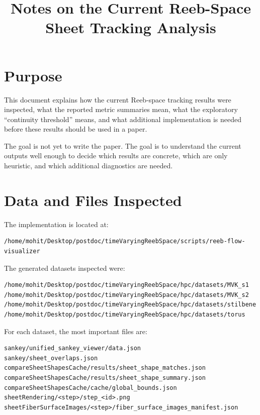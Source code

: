 \documentclass[11pt]{article}
\title{Notes on the Current Reeb-Space Sheet Tracking Analysis}
\author{}
\date{}
\begin{document}
\maketitle

\section{Purpose}

This document explains how the current Reeb-space tracking results were
inspected, what the reported metric summaries mean, what the exploratory
``continuity threshold'' means, and what additional implementation is needed
before these results should be used in a paper.

The goal is not yet to write the paper. The goal is to understand the current
outputs well enough to decide which results are concrete, which are only
heuristic, and which additional diagnostics are needed.

\section{Data and Files Inspected}

The implementation is located at:

\begin{verbatim}
/home/mohit/Desktop/postdoc/timeVaryingReebSpace/scripts/reeb-flow-visualizer
\end{verbatim}

The generated datasets inspected were:

\begin{verbatim}
/home/mohit/Desktop/postdoc/timeVaryingReebSpace/hpc/datasets/MVK_s1
/home/mohit/Desktop/postdoc/timeVaryingReebSpace/hpc/datasets/MVK_s2
/home/mohit/Desktop/postdoc/timeVaryingReebSpace/hpc/datasets/stilbene
/home/mohit/Desktop/postdoc/timeVaryingReebSpace/hpc/datasets/torus
\end{verbatim}

For each dataset, the most important files are:

\begin{verbatim}
sankey/unified_sankey_viewer/data.json
sankey/sheet_overlaps.json
compareSheetShapesCache/results/sheet_shape_matches.json
compareSheetShapesCache/results/sheet_shape_summary.json
compareSheetShapesCache/cache/global_bounds.json
sheetRendering/<step>/step_<id>.png
sheetFiberSurfaceImages/<step>/fiber_surface_images_manifest.json
\end{verbatim}
\end{document}
